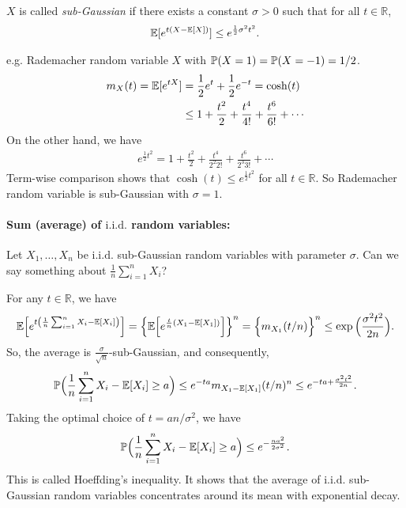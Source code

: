 \documentclass[11pt,letterpaper]{article}
\begin{document}
\begin{definition}
  $X$ is called \emph{sub-Gaussian} if there exists a constant $\sigma > 0$ such that for all $t \in \mathbb{R}$,
  \begin{align*}
    {\mathbb{E}} [e^{t (X - {\mathbb{E}} [X])}] \leq e^{\frac{1}{2} \sigma^2 t^2}.
  \end{align*} 
\end{definition}
e.g. Rademacher random variable $X$ with ${\mathbb{P}} (X = 1) = {\mathbb{P}} (X = -1) = 1/2$.
\begin{align*}
  m_X(t) = {\mathbb{E}} [e^{tX}] &= \frac{1}{2} e^t + \frac{1}{2} e^{-t} = \cosh (t)\\
  &\leq 1 + \frac{t^2}{2} + \frac{t^4}{4!} + \frac{t^6}{6!} + \cdots
\end{align*}
On the other hand, we have
\begin{align*}
  e^{\frac{1}{2} t^2} = 1 + \frac{t^2}{2} + \frac{t^4}{2^2 2!} + \frac{t^6}{2^3 3!} + \cdots
\end{align*}
Term-wise comparison shows that $\cosh (t) \leq e^{\frac{1}{2} t^2}$ for all $t \in \mathbb{R}$. So Rademacher random variable is sub-Gaussian with $\sigma = 1$.

\bigskip

\paragraph{Sum (average) of $\mathrm{i.i.d.}$ random variables:} Let $X_1, \ldots, X_n$ be $\mathrm{i.i.d.}$ sub-Gaussian random variables with parameter $\sigma$. Can we say something about $\frac{1}{n} \sum_{i=1}^n X_i$?

For any $t \in \mathbb{R}$, we have
\begin{align*}
  {\mathbb{E}} \Big[ e^{t \left( \frac{1}{n} \sum_{i=1}^n X_i - {\mathbb{E}} [X_i] \right)} \Big] = \Big\{ {\mathbb{E}} \Big[ e^{\frac{t}{n} (X_1 - {\mathbb{E}} [X_1])} \Big] \Big\}^n = \Big\{ m_{X_1}(t/n) \Big\}^n \leq \exp \Big(  \frac{ \sigma^2 t^2}{2n} \Big).
\end{align*}
So, the average is $\frac{\sigma}{\sqrt{n}}$-sub-Gaussian, and consequently,
\begin{align*}
  {\mathbb{P}} \Big( \frac{1}{n} \sum_{i=1}^n X_i - {\mathbb{E}} [X_i] \geq a \Big) \leq e^{-ta} m_{X_1 - {\mathbb{E}} [X_1]}(t/n)^n \leq e^{-ta + \frac{\sigma^2 t^2}{2n}}.
\end{align*}
Taking the optimal choice of $t = an / \sigma^2$, we have
\begin{align*}
  {\mathbb{P}} \Big( \frac{1}{n} \sum_{i=1}^n X_i - {\mathbb{E}} [X_i] \geq a \Big) \leq e^{- \frac{n a^2}{2\sigma^2}}.
\end{align*}
This is called Hoeffding's inequality. It shows that the average of $\mathrm{i.i.d.}$ sub-Gaussian random variables concentrates around its mean with exponential decay.
\end{document}
